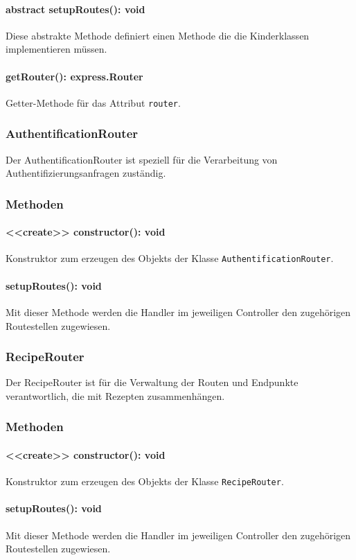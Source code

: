 \documentclass[parskip=full]{scrartcl}
\begin{document}
\paragraph{abstract setupRoutes(): void}Diese abstrakte Methode definiert einen Methode die die Kinderklassen implementieren müssen.
\paragraph{getRouter(): express.Router}Getter-Methode für das Attribut \texttt{router}.


\subsubsection{AuthentificationRouter}
Der AuthentificationRouter ist speziell für die Verarbeitung von Authentifizierungsanfragen zuständig.
\subsubsection*{Methoden}
\paragraph{<<create>> constructor(): void}Konstruktor zum erzeugen des Objekts der Klasse \newline
\texttt{AuthentificationRouter}.
\paragraph{setupRoutes(): void}Mit dieser Methode werden die Handler im jeweiligen Controller den zugehörigen Routestellen zugewiesen.

\subsubsection{RecipeRouter}
Der RecipeRouter ist für die Verwaltung der Routen und Endpunkte verantwortlich, die mit Rezepten zusammenhängen.
\subsubsection*{Methoden}
\paragraph{<<create>> constructor(): void}Konstruktor zum erzeugen des Objekts der Klasse \newline
\texttt{RecipeRouter}.
\paragraph{setupRoutes(): void}Mit dieser Methode werden die Handler im jeweiligen Controller den zugehörigen Routestellen zugewiesen.
\end{document}
